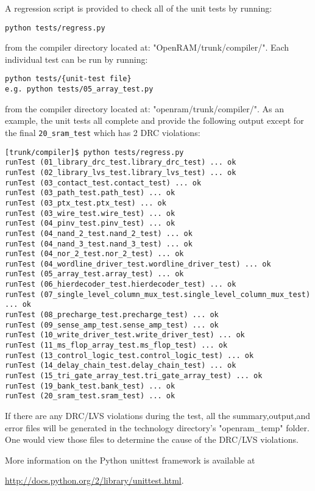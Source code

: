 A regression script is provided to check all of the unit tests by running:
\begin{verbatim}
python tests/regress.py
\end{verbatim}
from the compiler directory located at: "OpenRAM/trunk/compiler/". Each individual test can be run by running:
\begin{verbatim}
python tests/{unit-test file}
e.g. python tests/05_array_test.py
\end{verbatim}
from the compiler directory located at: "openram/trunk/compiler/". As an example, the unit tests all
complete and provide the following output except for the final
\verb|20_sram_test| which has 2 DRC violations:
\begin{verbatim}
[trunk/compiler]$ python tests/regress.py
runTest (01_library_drc_test.library_drc_test) ... ok
runTest (02_library_lvs_test.library_lvs_test) ... ok
runTest (03_contact_test.contact_test) ... ok
runTest (03_path_test.path_test) ... ok
runTest (03_ptx_test.ptx_test) ... ok
runTest (03_wire_test.wire_test) ... ok
runTest (04_pinv_test.pinv_test) ... ok
runTest (04_nand_2_test.nand_2_test) ... ok
runTest (04_nand_3_test.nand_3_test) ... ok
runTest (04_nor_2_test.nor_2_test) ... ok
runTest (04_wordline_driver_test.wordline_driver_test) ... ok
runTest (05_array_test.array_test) ... ok
runTest (06_hierdecoder_test.hierdecoder_test) ... ok
runTest (07_single_level_column_mux_test.single_level_column_mux_test) ... ok
runTest (08_precharge_test.precharge_test) ... ok
runTest (09_sense_amp_test.sense_amp_test) ... ok
runTest (10_write_driver_test.write_driver_test) ... ok
runTest (11_ms_flop_array_test.ms_flop_test) ... ok
runTest (13_control_logic_test.control_logic_test) ... ok
runTest (14_delay_chain_test.delay_chain_test) ... ok
runTest (15_tri_gate_array_test.tri_gate_array_test) ... ok
runTest (19_bank_test.bank_test) ... ok
runTest (20_sram_test.sram_test) ... ok  
\end{verbatim}

If there are any DRC/LVS violations during the test, all the summary,output,and error files
will be generated in the technology directory's "openram\_temp" folder. One would view those
files to determine the cause of the DRC/LVS violations.

More information on the Python unittest framework is available at\\
\begin{center}
\url{http://docs.python.org/2/library/unittest.html}.
\end{center}
